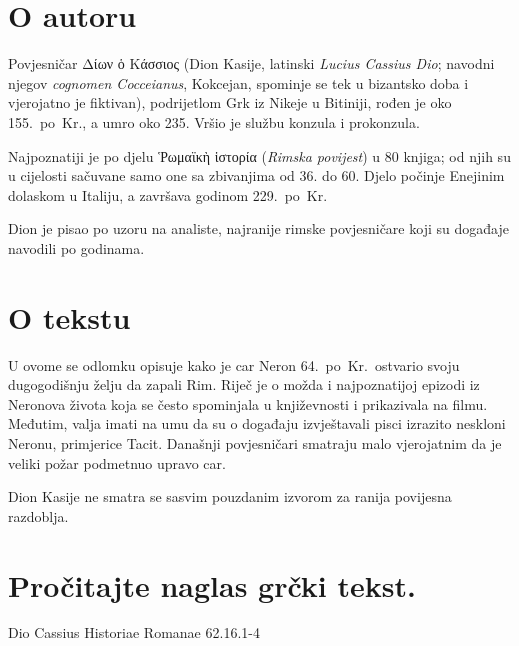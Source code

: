 \section*{O autoru}

Povjesničar \textgreek[variant=ancient]{Δίων ὁ Κάσσιος} (Dion Kasije, latinski \textit{Lucius Cassius Dio}; navodni njegov \textit{cognomen Cocceianus}, Kokcejan, spominje se tek u bizantsko doba i vjerojatno je fiktivan), podrijetlom Grk iz Nikeje u Bitiniji, rođen je oko 155.\ po~Kr., a umro oko 235. Vršio je službu konzula i prokonzula.

Najpoznatiji je po djelu \textgreek[variant=ancient]{Ῥωμαϊκὴ ἱστορία} (\textit{Rimska povijest}) u 80 knjiga; od njih su u cijelosti sačuvane samo one sa zbivanjima od 36. do 60. Djelo počinje Enejinim dolaskom u Italiju, a završava godinom 229.\ po~Kr. 

Dion je pisao po uzoru na analiste, najranije rimske povjesničare koji su događaje navodili po godinama.

\section*{O tekstu}

U ovome se odlomku opisuje kako je car Neron 64.\ po~Kr.\ ostvario svoju dugogodišnju želju da zapali Rim. Riječ je o možda i najpoznatijoj epizodi iz Neronova života koja se često spominjala u književnosti i prikazivala na filmu. Međutim, valja imati na umu da su o događaju izvještavali pisci izrazito neskloni Neronu, primjerice Tacit. Današnji povjesničari smatraju malo vjerojatnim da je veliki požar podmetnuo upravo car.

Dion Kasije ne smatra se sasvim pouzdanim izvorom za ranija povijesna razdoblja. 

\newpage

\section*{Pročitajte naglas grčki tekst.}

Dio Cassius Historiae Romanae 62.16.1-4

\medskip


